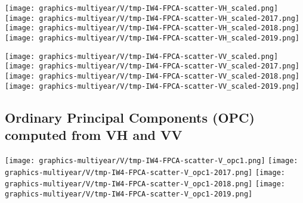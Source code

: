 \begin{center}
\begin{minipage}{7.0in}
\texttt{[image: graphics-multiyear/V/tmp-IW4-FPCA-scatter-VH\_scaled.png]}
\quad
\texttt{[image: graphics-multiyear/V/tmp-IW4-FPCA-scatter-VH\_scaled-2017.png]}
\vskip 1.0cm
\texttt{[image: graphics-multiyear/V/tmp-IW4-FPCA-scatter-VH\_scaled-2018.png]}
\quad
\texttt{[image: graphics-multiyear/V/tmp-IW4-FPCA-scatter-VH\_scaled-2019.png]}
\end{minipage}
\end{center}


\clearpage
\begin{center}
\begin{minipage}{7.0in}
\texttt{[image: graphics-multiyear/V/tmp-IW4-FPCA-scatter-VV\_scaled.png]}
\quad
\texttt{[image: graphics-multiyear/V/tmp-IW4-FPCA-scatter-VV\_scaled-2017.png]}
\vskip 1.0cm
\texttt{[image: graphics-multiyear/V/tmp-IW4-FPCA-scatter-VV\_scaled-2018.png]}
\quad
\texttt{[image: graphics-multiyear/V/tmp-IW4-FPCA-scatter-VV\_scaled-2019.png]}
\end{minipage}
\end{center}


\clearpage

\subsection{Ordinary Principal Components (OPC) computed from VH and VV}
\label{FPCA-scatter-opc}

\begin{center}
\begin{minipage}{7.0in}
\texttt{[image: graphics-multiyear/V/tmp-IW4-FPCA-scatter-V\_opc1.png]}
\quad
\texttt{[image: graphics-multiyear/V/tmp-IW4-FPCA-scatter-V\_opc1-2017.png]}
\vskip 1.0cm
\texttt{[image: graphics-multiyear/V/tmp-IW4-FPCA-scatter-V\_opc1-2018.png]}
\quad
\texttt{[image: graphics-multiyear/V/tmp-IW4-FPCA-scatter-V\_opc1-2019.png]}
\end{minipage}
\end{center}


